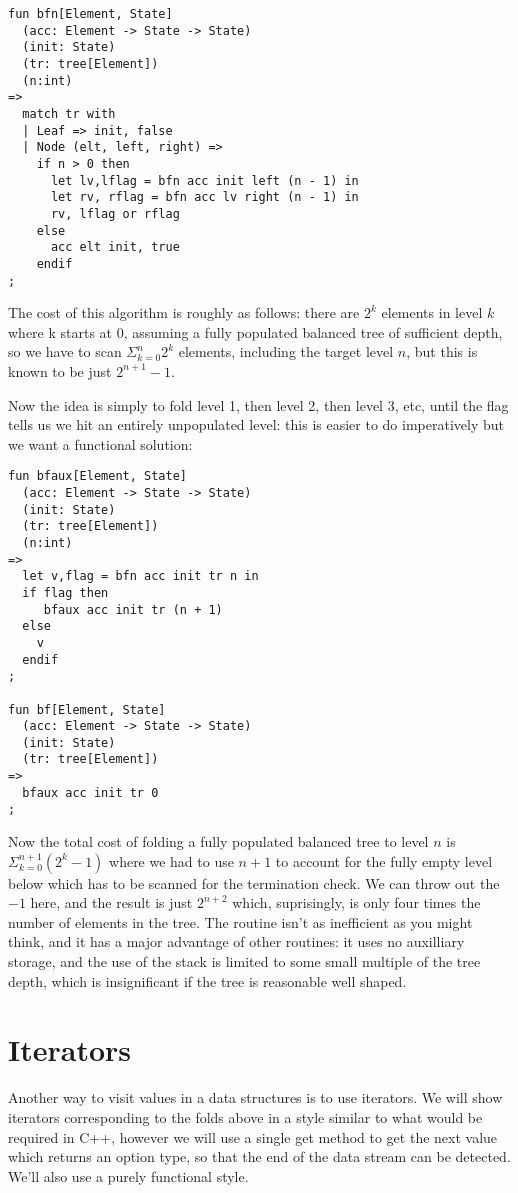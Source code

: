 \documentclass[oneside]{book}
\begin{document}
\begin{verbatim}
fun bfn[Element, State]
  (acc: Element -> State -> State)
  (init: State)
  (tr: tree[Element])
  (n:int)
=>
  match tr with
  | Leaf => init, false
  | Node (elt, left, right) =>
    if n > 0 then
      let lv,lflag = bfn acc init left (n - 1) in
      let rv, rflag = bfn acc lv right (n - 1) in
      rv, lflag or rflag
    else 
      acc elt init, true
    endif
;
\end{verbatim}

The cost of this algorithm is roughly as follows: there are $2^k$ elements
in level $k$ where k starts at 0, assuming a fully populated balanced
tree of sufficient depth, so we have to scan $\Sigma_{k=0}^n 2^k$
elements, including the target level $n$, but this is known
to be just $2^{n+1}-1$.

Now the idea is simply to fold level 1, then level 2, 
then level 3, etc, until the flag tells us we hit an
entirely unpopulated level: this is easier to do
imperatively but we want a functional solution:


\begin{verbatim}
fun bfaux[Element, State]
  (acc: Element -> State -> State)
  (init: State)
  (tr: tree[Element])
  (n:int)
=>
  let v,flag = bfn acc init tr n in
  if flag then 
     bfaux acc init tr (n + 1)
  else 
    v
  endif
;

fun bf[Element, State]
  (acc: Element -> State -> State)
  (init: State)
  (tr: tree[Element])
=>
  bfaux acc init tr 0
;
\end{verbatim}

Now the total cost of folding a fully populated balanced tree to level $n$
is $\Sigma_{k=0}^{n+1} (2^k-1)$ where we had to use $n+1$ to account for the
fully empty level below which has to be scanned for the termination check.
We can throw out the $-1$ here, and the result is just $2^{n+2}$ which,
suprisingly, is only four times the number of elements in the tree. 
The routine isn't as inefficient as you might think, and it has
a major advantage of other routines: it uses no auxilliary storage,
and the use of the stack is limited to some small multiple of the
tree depth, which is insignificant if the tree is reasonable well
shaped.


\section{Iterators}
Another way to visit values in a data structures is to use iterators.
We will show iterators corresponding to the folds above in a style
similar to what would be required in C++, however we will use a single
get method to get the next value which returns an option type, so
that the end of the data stream can be detected. We'll also use a purely
functional style.
\end{document}
